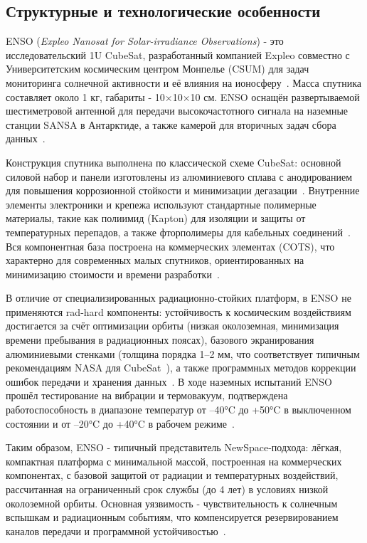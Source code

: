 \subsection{Структурные и технологические особенности}

ENSO (\textit{Expleo Nanosat for Solar-irradiance Observations}) - это
исследовательский 1U CubeSat, разработанный компанией Expleo совместно с
Университетским космическим центром Монпелье (CSUM) для задач мониторинга
солнечной активности и её влияния на ионосферу~\cite{expleo_enso_pdf,
	nanosats_enso, expleo_enso_launch}. Масса спутника составляет около 1 кг,
габариты - 10$\times$10$\times$10 см. ENSO оснащён развертываемой шестиметровой
антенной для передачи высокочастотного сигнала на наземные станции SANSA в
Антарктиде, а также камерой для вторичных задач сбора
данных~\cite{nanosats_enso, expleo_enso_launch}.

Конструкция спутника выполнена по классической схеме CubeSat: основной силовой
набор и панели изготовлены из алюминиевого сплава с анодированием для повышения
коррозионной стойкости и минимизации дегазации~\cite{expleo_enso_pdf,
	nanosats_enso}. Внутренние элементы электроники и крепежа используют стандартные
полимерные материалы, такие как полиимид (Kapton) для изоляции и защиты от
температурных перепадов, а также фторполимеры для кабельных
соединений~\cite{curbell_plastics}. Вся компонентная база построена на
коммерческих элементах (COTS), что характерно для современных малых спутников,
ориентированных на минимизацию стоимости и времени
разработки~\cite{expleo_enso_pdf, nanosats_enso}.

В отличие от специализированных радиационно-стойких платформ, в ENSO не
применяются rad-hard компоненты: устойчивость к космическим воздействиям
достигается за счёт оптимизации орбиты (низкая околоземная, минимизация времени
пребывания в радиационных поясах), базового экранирования алюминиевыми стенками
(толщина порядка 1–2 мм, что соответствует типичным рекомендациям NASA для
CubeSat~\cite{nasa_shielding}), а также программных методов коррекции ошибок
передачи и хранения данных~\cite{expleo_enso_pdf, nanosats_enso,
	nasa_shielding}. В ходе наземных испытаний ENSO прошёл тестирование на вибрации
и термовакуум, подтверждена работоспособность в диапазоне температур от –40°C до
+50°C в выключенном состоянии и от –20°C до +40°C в рабочем
режиме~\cite{expleo_enso_pdf}.

Таким образом, ENSO - типичный представитель NewSpace-подхода: лёгкая,
компактная платформа с минимальной массой, построенная на коммерческих
компонентах, с базовой защитой от радиации и температурных воздействий,
рассчитанная на ограниченный срок службы (до 4 лет) в условиях низкой
околоземной орбиты. Основная уязвимость - чувствительность к солнечным вспышкам
и радиационным событиям, что компенсируется резервированием каналов передачи и
программной устойчивостью~\cite{nasa_shielding, expleo_enso_pdf}.

